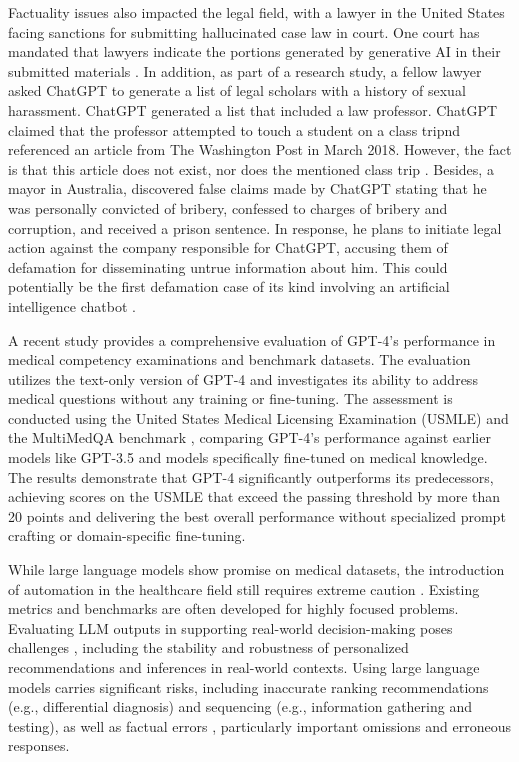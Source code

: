 Factuality issues also impacted the legal field, with a lawyer in the United States facing sanctions for submitting hallucinated case law in court. One court has mandated that lawyers indicate the portions generated by generative AI in their submitted materials \citep{curran2023hallucination}.
In addition, as part of a research study, a fellow lawyer asked ChatGPT to generate a list of legal scholars with a history of sexual harassment. ChatGPT generated a list that included a law professor. ChatGPT claimed that the professor attempted to touch a student on a class tripnd referenced an article from The Washington Post in March 2018. However, the fact is that this article does not exist, nor does the mentioned class trip \citep{Pranshu2023}.
Besides, a mayor in Australia, discovered false claims made by ChatGPT stating that he was personally convicted of bribery, confessed to charges of bribery and corruption, and received a prison sentence. In response, he plans to initiate legal action against the company responsible for ChatGPT, accusing them of defamation for disseminating untrue information about him. This could potentially be the first defamation case of its kind involving an artificial intelligence chatbot \citep{news_mayor}.

A recent study \citep{nori2023capabilities} provides a comprehensive evaluation of GPT-4's performance in medical competency examinations and benchmark datasets. The evaluation utilizes the text-only version of GPT-4 and investigates its ability to address medical questions without any training or fine-tuning. The assessment is conducted using the United States Medical Licensing Examination (USMLE) \cite{USMLE_evaluation} and the MultiMedQA benchmark \cite{MultiMedQA}, comparing GPT-4's performance against earlier models like GPT-3.5 and models specifically fine-tuned on medical knowledge. The results demonstrate that GPT-4 significantly outperforms its predecessors, achieving scores on the USMLE that exceed the passing threshold by more than 20 points and delivering the best overall performance without specialized prompt crafting or domain-specific fine-tuning. 

While large language models show promise on medical datasets, the introduction of automation in the healthcare field still requires extreme caution \cite{shen2023chatgpt}. Existing metrics and benchmarks are often developed for highly focused problems. Evaluating LLM outputs in supporting real-world decision-making poses challenges \cite{MultiMedQA}, including the stability and robustness of personalized recommendations and inferences in real-world contexts.  Using large language models carries significant risks, including inaccurate ranking recommendations \cite{hirosawa2023diagnostic} (e.g., differential diagnosis) and sequencing \cite{lm_bio} (e.g., information gathering and testing), as well as factual errors \cite{shen2023chatgpt}, particularly important omissions and erroneous responses. 
